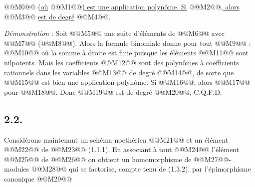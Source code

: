 
@@M0@@
\uline{(où} @@M1@@\uline{) est une application polynôme. Si} @@M2@@\uline{, alors} @@M3@@ \uline{est de degré} @@M4@@.

\emph{Démonstration} : Soit @@M5@@ une suite d'éléments de @@M6@@ avec @@M7@@ (@@M8@@). Alors la formule binomiale donne pour tout @@M9@@ :
@@M10@@
où la somme à droite est finie puisque les éléments @@M11@@ sont nilpotents. Mais les coefficients @@M12@@ sont des polynômes à coefficients rationnels dans les variables @@M13@@ de degré @@M14@@, de sorte que @@M15@@ est bien une application polynôme. Si @@M16@@, alors @@M17@@ pour @@M18@@. Donc @@M19@@ est de degré @@M20@@, C.Q.F.D.

\subsection*{2.2.}
Considérons maintenant un schéma noethérien @@M21@@ et un élément @@M22@@ de @@M23@@ (1.1.1). En associant à tout @@M24@@ l'élément @@M25@@ de @@M26@@ on obtient un homomorphisme de @@M27@@-modules
@@M28@@
qui se factorise, compte tenu de (1.3.2), par l'épimorphisme canonique
@@M29@@
